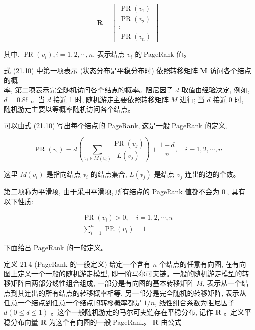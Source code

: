 \documentclass[10pt]{article}
\begin{document}
\begin{CJK*}{UTF8}{bsmi}
$$
\boldsymbol{R}=\left[\begin{array}{c}
\operatorname{PR}\left(v_{1}\right) \\
\operatorname{PR}\left(v_{2}\right) \\
\vdots \\
\operatorname{PR}\left(v_{n}\right)
\end{array}\right]
$$

其中, $\operatorname{PR}\left(v_{i}\right), i=1,2, \cdots, n$, 表示结点 $v_{i}$ 的 PageRank 值。

式 (21.10) 中第一项表示 (状态分布是平稳分布时) 依照转移矩阵 $\boldsymbol{M}$ 访问各个结点的概\\
率, 第二项表示完全随机访问各个结点的概率。阻尼因子 $d$ 取值由经验决定, 例如, $d=0.85$ 。当 $d$ 接近 1 时, 随机游走主要依照转移矩阵 $M$ 进行; 当 $d$ 接近 0 时, 随机游走主要以等概率随机访问各个结点。

可以由式 (21.10) 写出每个结点的 PageRank, 这是一般 PageRank 的定义。


\begin{equation*}
\operatorname{PR}\left(v_{i}\right)=d\left(\sum_{v_{j} \in M\left(v_{i}\right)} \frac{\operatorname{PR}\left(v_{j}\right)}{L\left(v_{j}\right)}\right)+\frac{1-d}{n}, \quad i=1,2, \cdots, n \tag{21.11}
\end{equation*}


这里 $M\left(v_{i}\right)$ 是指向结点 $v_{i}$ 的结点集合, $L\left(v_{j}\right)$ 是结点 $v_{j}$ 连出的边的个数。

第二项称为平滑项, 由于采用平滑项, 所有结点的 PageRank 值都不会为 0 , 具有以下性质:


\begin{gather*}
\operatorname{PR}\left(v_{i}\right)>0, \quad i=1,2, \cdots, n  \tag{21.12}\\
\sum_{i=1}^{n} \operatorname{PR}\left(v_{i}\right)=1 \tag{21.13}
\end{gather*}


下面给出 PageRank 的一般定义。

定义 21.4 (PageRank 的一般定义) 给定一个含有 $n$ 个结点的任意有向图, 在有向图上定义一个一般的随机游走模型, 即一阶马尔可夫链。一般的随机游走模型的转移矩阵由两部分线性组合组成, 一部分是有向图的基本转移矩阵 $M$, 表示从一个结点到其连出的所有结点的转移概率相等, 另一部分是完全随机的转移矩阵, 表示从任意一个结点到任意一个结点的转移概率都是 $1 / n$, 线性组合系数为阻尼因子 $d(0 \leqslant d \leqslant 1)$ 。这个一般随机游走的马尔可夫链存在平稳分布, 记作 $\boldsymbol{R}$ 。定义平稳分布向量 $\boldsymbol{R}$ 为这个有向图的一般 PageRank。 $\boldsymbol{R}$ 由公式



\end{CJK*}
\end{document}

